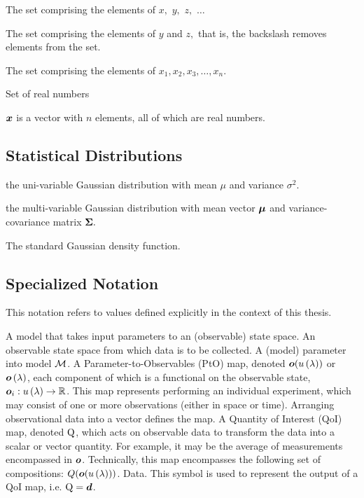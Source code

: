 \begin{description}[leftmargin=!, labelwidth=0.8in]
  \item[$\{x, y, z, \ldots\}$]  The set comprising the elements of $x,$ $y,$ $z,$ $\ldots$ 
  \item[$\{x, y, z\} \backslash x$]  The set comprising the elements of $y$ and $z,$ that is, the backslash removes elements from the set.
  \item[$\left\{x_i\right\}_{i = 1}^{n}$]  The set comprising the elements of $x_1, x_2, x_3, \ldots, x_n.$ 
  \item[$\mathbb{R}$] Set of real numbers 
  \item[$\bs{x} \in \mathbb{R}^n$] $\boldsymbol{x}$ is a vector with $n$ elements, all of which are real numbers.
\end{description}

\subsection{Statistical Distributions}
\begin{description}[leftmargin=!, labelwidth=0.8in]
  \item[$\mathcal{N} \left( \mu, \sigma^2 \right)$] the uni-variable Gaussian distribution with mean $\mu$ and variance $\sigma^2.$ 
  \item[$\mathcal{N} \left( \bs{\mu}, \bs{\Sigma} \right)$] the multi-variable Gaussian distribution with mean vector $\boldsymbol{\mu}$ and variance-covariance matrix $\boldsymbol{\Sigma}.$
  \item[$\phi(x)$] The standard Gaussian density function.
\end{description}

\subsection{Specialized Notation}
This notation refers to values defined explicitly in the context of this thesis.

\begin{itemize}
\itembox{$\M$} A model that takes input parameters to an (observable) state space.
 An observable state space from which data is to be collected.
\itembox{$\param$} A (model) parameter into model $\M$.
\itembox{$\obs$} A Parameter-to-Observables (PtO) map, denoted $\operatorname*{\boldsymbol{o}}( u\operatorname*{\left ( \lambda \right )} )$ or $\operatorname*{\boldsymbol{o}}\operatorname*{\left ( \lambda \right )}$, each component of which is a functional on the observable state, $\operatorname*{\boldsymbol{o}}_i: u\operatorname*{\left ( \lambda \right )} \to \mathbb{R}$. This map represents performing an individual experiment, which may consist of one or more observations (either in space or time). Arranging observational data into a vector defines the map.
\itembox{$\qoi$} A Quantity of Interest (QoI) map, denoted $\qoi$, which acts on observable data to transform the data into a scalar or vector quantity. For example, it may be the average of measurements encompassed in $\obs$. Technically, this map encompasses the following set of compositions: $Q(\operatorname*{\boldsymbol{o}}(u\operatorname*{\left ( \lambda \right )}))$.
\itembox{$\data$} Data. This symbol is used to represent the output of a QoI map, i.e. $\operatorname*{Q} = \operatorname*{\boldsymbol{d}}$.
\end{itemize}